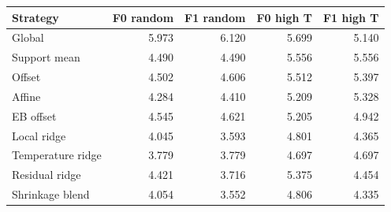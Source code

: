 \begin{tabular}{lrrrr}
\toprule
Strategy & F0 random & F1 random & F0 high T & F1 high T \\
\midrule
Global & 5.973 & 6.120 & 5.699 & 5.140 \\
Support mean & 4.490 & 4.490 & 5.556 & 5.556 \\
Offset & 4.502 & 4.606 & 5.512 & 5.397 \\
Affine & 4.284 & 4.410 & 5.209 & 5.328 \\
EB offset & 4.545 & 4.621 & 5.205 & 4.942 \\
Local ridge & 4.045 & 3.593 & 4.801 & 4.365 \\
Temperature ridge & 3.779 & 3.779 & 4.697 & 4.697 \\
Residual ridge & 4.421 & 3.716 & 5.375 & 4.454 \\
Shrinkage blend & 4.054 & 3.552 & 4.806 & 4.335 \\
\bottomrule
\end{tabular}
